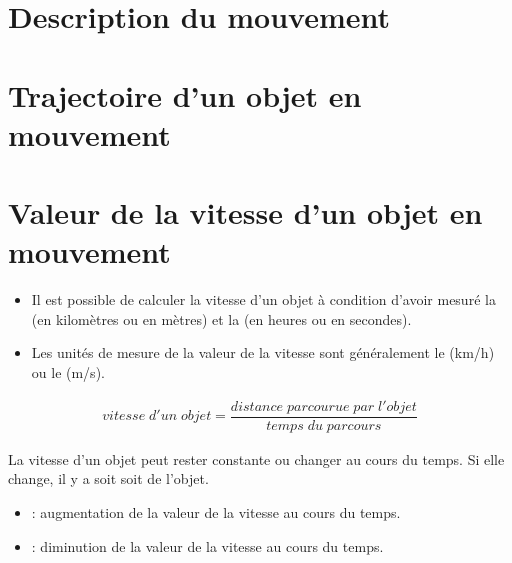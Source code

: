 \documentclass[12pt,a4paper]{article}
\date{}
\title{}
\begin{document}
	
	


\section{Description du mouvement}




\section{Trajectoire d'un objet en mouvement }





\section{Valeur de la vitesse d'un objet en mouvement}






\begin{mybilan}
\begin{itemize}
\item Il est possible de calculer la vitesse d'un objet à condition d'avoir mesuré la  (en kilomètres ou en mètres) et la  (en heures ou en secondes). 

\item Les unités de mesure de la valeur de la vitesse sont généralement le  (km/h) ou le  (m/s).
\end{itemize}



\end{mybilan}



\begin{align*}
vitesse\; d'un\; objet = \dfrac{distance \;  parcourue \; par \; l'objet}{temps \; du  \; parcours}
\end{align*}





\begin{mydefs}
La vitesse d'un objet peut rester constante ou changer au cours du temps.
Si elle change, il y a soit  soit  de l'objet. 

\begin{itemize}
	\item {} : \pause  augmentation de la valeur de la vitesse au cours du temps.\pause
	
	\item {} : \pause diminution de la valeur de la vitesse au cours du temps.
\end{itemize}


\end{mydefs}
\end{document}
